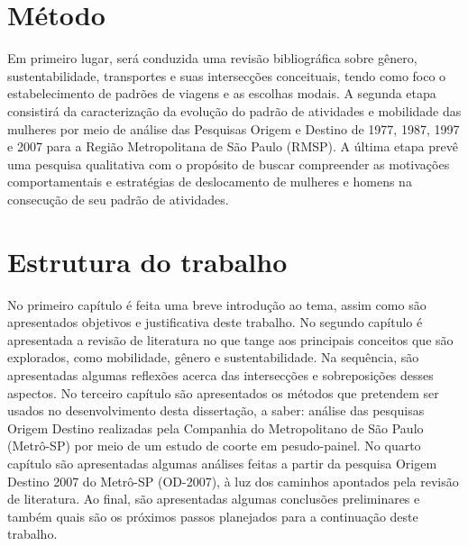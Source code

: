 \section{Método}

Em primeiro lugar, será conduzida uma revisão bibliográfica sobre gênero, sustentabilidade, transportes e suas intersecções conceituais, tendo como foco o estabelecimento de padrões de viagens e as escolhas modais.
A segunda etapa consistirá da caracterização da evolução do padrão de atividades e mobilidade das mulheres por meio de análise das Pesquisas Origem e Destino de 1977, 1987, 1997 e 2007 para a Região Metropolitana de São Paulo (RMSP).
A última etapa prevê uma pesquisa qualitativa com o propósito de buscar compreender as motivações comportamentais e estratégias de deslocamento de mulheres e homens na consecução de seu padrão de atividades.

\section{Estrutura do trabalho}

No primeiro capítulo é feita uma breve introdução ao tema, assim como são apresentados objetivos e justificativa deste trabalho.
No segundo capítulo é apresentada a revisão de literatura no que tange aos principais conceitos que são explorados, como mobilidade, gênero e sustentabilidade. Na sequência, são apresentadas algumas reflexões acerca das intersecções e sobreposições desses aspectos.
No terceiro capítulo são apresentados os métodos que pretendem ser usados no desenvolvimento desta dissertação, a saber: análise das pesquisas Origem Destino realizadas pela Companhia do Metropolitano de São Paulo (Metrô-SP) por meio de um estudo de coorte em pesudo-painel.
No quarto capítulo são apresentadas algumas análises feitas a partir da pesquisa Origem Destino 2007 do Metrô-SP (OD-2007), à luz dos caminhos apontados pela revisão de literatura.
Ao final, são apresentadas algumas conclusões preliminares e também quais são os próximos passos planejados para a continuação deste trabalho.
